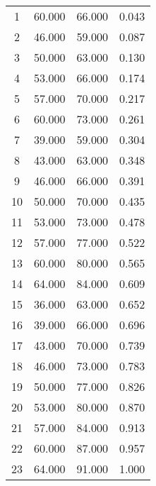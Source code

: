 % 
\begin{tabular}{cccc}
  \hline
  \hline
1 & 60.000 & 66.000 & 0.043 \\ 
  2 & 46.000 & 59.000 & 0.087 \\ 
  3 & 50.000 & 63.000 & 0.130 \\ 
  4 & 53.000 & 66.000 & 0.174 \\ 
  5 & 57.000 & 70.000 & 0.217 \\ 
  6 & 60.000 & 73.000 & 0.261 \\ 
  7 & 39.000 & 59.000 & 0.304 \\ 
  8 & 43.000 & 63.000 & 0.348 \\ 
  9 & 46.000 & 66.000 & 0.391 \\ 
  10 & 50.000 & 70.000 & 0.435 \\ 
  11 & 53.000 & 73.000 & 0.478 \\ 
  12 & 57.000 & 77.000 & 0.522 \\ 
  13 & 60.000 & 80.000 & 0.565 \\ 
  14 & 64.000 & 84.000 & 0.609 \\ 
  15 & 36.000 & 63.000 & 0.652 \\ 
  16 & 39.000 & 66.000 & 0.696 \\ 
  17 & 43.000 & 70.000 & 0.739 \\ 
  18 & 46.000 & 73.000 & 0.783 \\ 
  19 & 50.000 & 77.000 & 0.826 \\ 
  20 & 53.000 & 80.000 & 0.870 \\ 
  21 & 57.000 & 84.000 & 0.913 \\ 
  22 & 60.000 & 87.000 & 0.957 \\ 
  23 & 64.000 & 91.000 & 1.000 \\ 
   \hline
\end{tabular}
